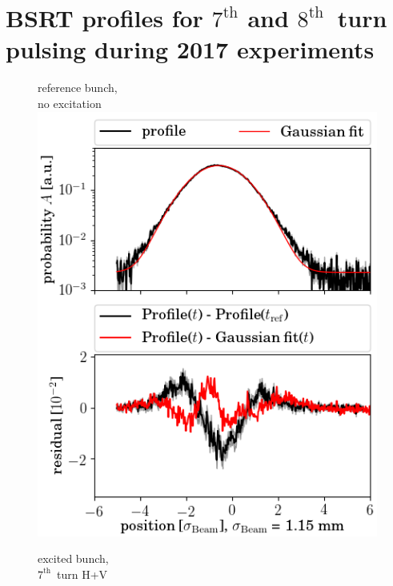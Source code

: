 \documentclass[%
 reprint,
 amsmath,amssymb,
 aps,
prstab,
]{revtex4-1}
\begin{document}
\section{BSRT profiles for $7^{\mathrm{th}}$ and $8^{\mathrm{th}}$~turn pulsing during 2017 experiments}
\label{app:sec:bsrtprof}
\begin{figure}[h]
	\begin{minipage}[t]{0.49\linewidth}
		\centering
		reference bunch,\\ no excitation
		\includegraphics[width=1.0\linewidth]{profile_v_7thhv_slot_2862.png}
	\end{minipage}
	\begin{minipage}[t]{0.49\linewidth}
		\centering
		excited bunch,\\ $7^{\mathrm{th}}$~turn H+V	

\end{minipage}
\end{figure}
\end{document}
